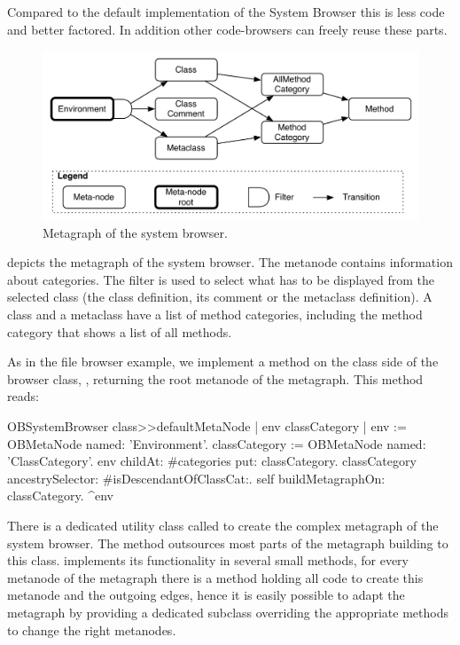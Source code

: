 \documentclass[a4paper,10pt,twoside]{book}
\begin{document}
Compared to the default implementation of the \pharo System Browser this is less code and better factored. In addition other code-browsers can freely reuse these parts.

\begin{figure}[!ht]
\begin{center}
\includegraphics[scale=0.55]{ob-graph}
\caption{Metagraph of the system browser.} 
\end{center}
\end{figure}

 depicts the metagraph of the system browser. The metanode  contains information about categories. The filter is used to select what has to be displayed from the selected class (\ie the class definition, its comment or the metaclass definition). A class and a metaclass have a list of method categories, including the  method category that shows a list of all methods.

As in the file browser example, we implement a method  on the class side of the browser class, \ie {}, returning the root metanode of the metagraph. This method reads:

\begin{code}{}
OBSystemBrowser class>>defaultMetaNode
	| env classCategory |
	env := OBMetaNode named: 'Environment'.
	classCategory := OBMetaNode named: 'ClassCategory'.
	env childAt: #categories put: classCategory.
	classCategory ancestrySelector: #isDescendantOfClassCat:.
	self buildMetagraphOn: classCategory.
	^env
\end{code}

There is a dedicated utility class called  to create the complex metagraph of the system browser. The method  outsources most parts of the metagraph building to this class.  implements its functionality in several small methods, \ie for every metanode of the metagraph there is a method holding all code to create this metanode and the outgoing edges, hence it is easily possible to adapt the metagraph by providing a dedicated subclass overriding the appropriate methods to change the right metanodes. 
\end{document}

